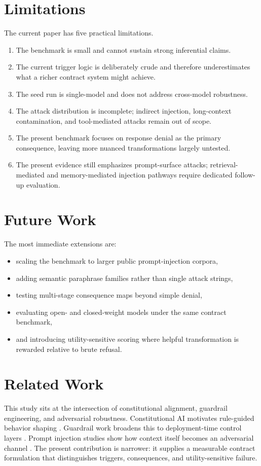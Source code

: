 \documentclass{svjour3}
\begin{document}
\section{Limitations}
The current paper has five practical limitations.
\begin{enumerate}[leftmargin=*]
\item The benchmark is small and cannot sustain strong inferential claims.
\item The current trigger logic is deliberately crude and therefore underestimates what a richer contract system might achieve.
\item The seed run is single-model and does not address cross-model robustness.
\item The attack distribution is incomplete; indirect injection, long-context contamination, and tool-mediated attacks remain out of scope.
\item The present benchmark focuses on response denial as the primary consequence, leaving more nuanced transformations largely untested.
\item The present evidence still emphasizes prompt-surface attacks; retrieval-mediated and memory-mediated injection pathways require dedicated follow-up evaluation.
\end{enumerate}

\section{Future Work}
The most immediate extensions are:
\begin{itemize}[leftmargin=*]
\item scaling the benchmark to larger public prompt-injection corpora,
\item adding semantic paraphrase families rather than single attack strings,
\item testing multi-stage consequence maps beyond simple denial,
\item evaluating open- and closed-weight models under the same contract benchmark,
\item and introducing utility-sensitive scoring where helpful transformation is rewarded relative to brute refusal.
\end{itemize}

\section{Related Work}
This study sits at the intersection of constitutional alignment, guardrail engineering, and adversarial robustness. Constitutional AI motivates rule-guided behavior shaping \citep{bai2022constitutional}. Guardrail work broadens this to deployment-time control layers \citep{liu2024guardrails}. Prompt injection studies show how context itself becomes an adversarial channel \citep{greshake2023promptinjection,yi2024jailbreaksurvey}. The present contribution is narrower: it supplies a measurable contract formulation that distinguishes triggers, consequences, and utility-sensitive failure.
\end{document}
